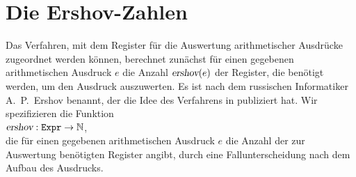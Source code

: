 \section{Die Ershov-Zahlen}
Das Verfahren, mit dem Register f\"ur die Auswertung arithmetischer Ausdr\"ucke zugeordnet werden k\"onnen,
berechnet zun\"achst f\"ur einen gegebenen arithmetischen Ausdruck $e$ die Anzahl $\textsl{ershov}(e)$
der Register, die ben\"otigt werden, um den Ausdruck auszuwerten.  Es ist nach dem russischen
Informatiker A.~P.~Ershov benannt, der die Idee des  Verfahrens in \cite{ershov:58} publiziert hat.
Wir spezifizieren die Funktion
\\[0.2cm]
\hspace*{1.3cm}
$\textsl{ershov}: \mathtt{Expr} \rightarrow \mathbb{N}$,
\\[0.2cm]
die f\"ur einen gegebenen arithmetischen Ausdruck $e$ die Anzahl der zur Auswertung ben\"otigten
Register angibt, durch eine Fallunterscheidung nach dem Aufbau des Ausdrucks.
